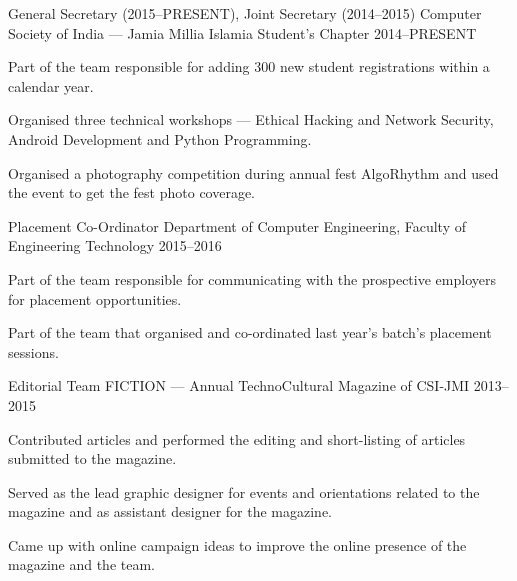
\begin{cventries}

\cventry%
  {General Secretary (2015--PRESENT), Joint Secretary (2014--2015)} %
  {Computer Society of India --- Jamia Millia Islamia Student's Chapter} %
  {} %
  {2014--PRESENT} %
  {%
    \begin{cvitems} %
      \item{Part of the team responsible for adding 300 new student
            registrations within a calendar year.}
      \item{Organised three technical workshops --- Ethical Hacking and Network
            Security, Android Development and Python Programming.}
      \item{Organised a photography competition during annual fest AlgoRhythm
            and used the event to get the fest photo coverage.}
    \end{cvitems}
  }

\cventry%
  {Placement Co-Ordinator} %
  {Department of Computer Engineering, Faculty of Engineering Technology} %
  {} %
  {2015--2016} %
  {%
    \begin{cvitems} %
      \item{Part of the team responsible for communicating with the
            prospective employers for placement opportunities.}
      \item{Part of the team that organised and co-ordinated last year's
            batch's placement sessions.}
    \end{cvitems}
  }

\cventry%
  {Editorial Team} %
  {FICTION --- Annual TechnoCultural Magazine of CSI-JMI} %
  {} %
  {2013--2015} %
  {%
    \begin{cvitems} %
      \item{Contributed articles and performed the editing and short-listing of
            articles submitted to the magazine.}
      \item{Served as the lead graphic designer for events and orientations
            related to the magazine and as assistant designer for the magazine.}
      \item{Came up with online campaign ideas to improve the online presence
            of the magazine and the team.}
    \end{cvitems}
  }


\end{cventries}
